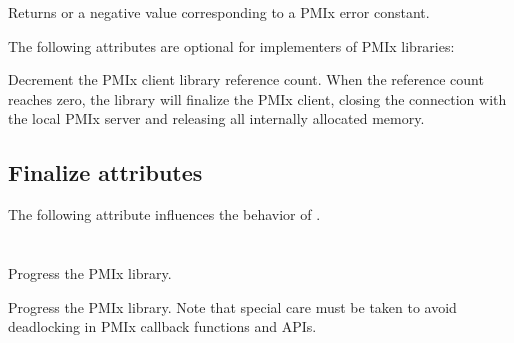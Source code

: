 \begin{arglist}
\end{arglist}

Returns  or a negative value corresponding to a PMIx error constant.

\optattrstart
The following attributes are optional for implementers of \ac{PMIx} libraries:

\optattrend

\descr

Decrement the \ac{PMIx} client library reference count.
When the reference count reaches zero, the library will finalize the \ac{PMIx} client, closing the connection with the local \ac{PMIx} server and releasing all internally allocated memory.

\subsection{Finalize attributes}

The following attribute influences the behavior of .

%


\section{}

\summary

Progress the \ac{PMIx} library.

\format



\descr

Progress the \ac{PMIx} library. Note that special care must be taken to avoid deadlocking in \ac{PMIx} callback functions and \acp{API}.

